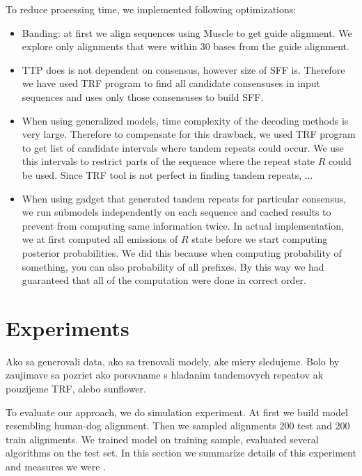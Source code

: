 To reduce processing time, we implemented following optimizations:
\begin{itemize}
\item Banding: at first we align sequences using Muscle\cite{} to get guide
alignment. We explore only alignments that were within 30 bases from the guide
alignment.

\item TTP does is not dependent on consensus, however size of SFF is. Therefore
we have used TRF program to find all candidate consensuses in input sequences
and uses only those consensuses to build SFF.

\item When using generalized models, time complexity of the decoding methods is
very large.  Therefore to compensate for this drawback, we used TRF program to
get list of candidate intervals where tandem repeats could occur. We use this
intervals to restrict parts of the sequence where the repeat state $R$ could be
used. Since TRF tool is not perfect in finding tandem repeats, ...

\item When using gadget that generated tandem repeats for particular consensus,
we run submodels independently on each sequence and cached results to prevent
from computing same information twice. In actual implementation, we at first
computed all emissions of $R$ state before we start computing posterior
probabilities. We did this because when computing probability of something, you
can also probability of all prefixes.  By this way we had guaranteed that all
of the computation were done in correct order.

\end{itemize}

\section{Experiments}
\begin{reformulate*}
Ako sa generovali data, ako sa trenovali modely, ake miery sledujeme.  Bolo by
zaujimave sa pozriet ako porovname s hladanim tandemovych repeatov ak pouzijeme
TRF, alebo sunflower.

\end{reformulate*}

To evaluate our approach, we do simulation experiment. At first we build model
resembling human-dog alignment. Then we sampled alignments 200 test and 200
train alignments. We trained model on training sample, evaluated several algorithms
on the test set. In this section we summarize details of this experiment and 
measures we were .


